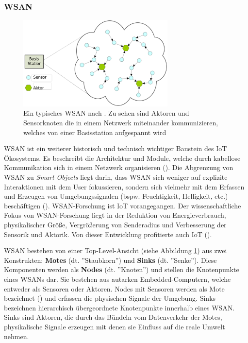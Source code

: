 \subsubsection{\acl{WSAN}}\label{subsubsec:wsan}
\begin{figure}[h]
    \centering
    \includegraphics[width=0.7\textwidth]{bilder/chapter2/wsan.pdf}
    \caption{Ein typisches \ac{WSAN} nach \cite{feng2008wsan}. Zu sehen sind Aktoren und Sensorknoten die in einem Netzwerk miteinander kommunizieren, welches von einer Basisstation aufgespannt wird}
    \label{fig:WSAN}
\end{figure}
\ac{WSAN} ist ein weiterer historisch und technisch wichtiger Baustein des \ac{IoT} Ökosystems. Es beschreibt die Architektur und Module, welche durch kabellose Kommunikation sich in einem Netzwerk organisieren (\cite{ferrara2013smart}). Die Abgrenzung von \ac{WSAN} zu \textit{Smart Objects} liegt darin, dass \ac{WSAN} sich weniger auf explizite Interaktionen mit dem User fokussieren, sondern sich vielmehr mit dem Erfassen und Erzeugen von Umgebungssignalen (bspw. Feuchtigkeit, Helligkeit, etc.) beschäftigen (\cite{Madakam2015litRev}). \ac{WSAN}-Forschung ist \ac{IoT} vorangegangen. Der wissenschaftliche Fokus von \ac{WSAN}-Forschung liegt in der Reduktion von Energieverbrauch, physikalischer Größe, Vergrößerung von Senderadius und Verbesserung der Sensorik und Aktorik. Von dieser Entwicklung profitierte auch \ac{IoT} (\cite{lopez2011taxonomy}).

\ac{WSAN} bestehen von einer Top-Level-Ansicht (siehe Abbildung \ref{fig:WSAN}) aus zwei Konstrukten: \textbf{Motes} (dt. ''Staubkorn'') und \textbf{Sinks} (dt. ''Senke''). Diese Komponenten werden als \textbf{Nodes} (dt. ''Knoten'') und stellen die Knotenpunkte eines \acp{WSAN} dar. Sie bestehen aus autarken Embedded-Computern, welche entweder als Sensoren oder Aktoren. Nodes mit Sensoren werden als Mote bezeichnet (\cite{salarian2012coordination}) und erfassen die physischen Signale der Umgebung. Sinks bezeichnen hierarchisch übergeordnete Knotenpunkte innerhalb eines \ac{WSAN}. Sinks sind Aktoren, die durch das Bündeln vom Datenverkehr der Motes, physikalische Signale erzeugen mit denen sie Einfluss auf die reale Umwelt nehmen.

